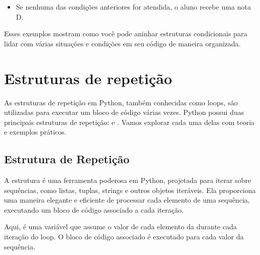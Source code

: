 \documentclass[letterpaper,10pt,english]{jupyterBook}
\begin{document}
\sphinxAtStartPar
{}
\begin{itemize}
\item {} 
\sphinxAtStartPar
Se nenhuma das condições anteriores for atendida, o aluno recebe uma nota D.

\end{itemize}

\sphinxAtStartPar
Esses exemplos mostram como você pode aninhar estruturas condicionais para lidar com várias situações e condições em seu código de maneira organizada.


\section{Estruturas de repetição}
\label{\detokenize{chapters/ch4/ch4:estruturas-de-repeticao}}
\sphinxAtStartPar
As estruturas de repetição em Python, também conhecidas como loops, são utilizadas para executar um bloco de código várias vezes. Python possui duas principais estruturas de repetição:  e . Vamos explorar cada uma delas com teoria e exemplos práticos.


\subsection{Estrutura de Repetição }
\label{\detokenize{chapters/ch4/ch4:estrutura-de-repeticao-for}}
\sphinxAtStartPar
A estrutura  é uma ferramenta poderosa em Python, projetada para iterar sobre sequências, como listas, tuplas, strings e outros objetos iteráveis. Ela proporciona uma maneira elegante e eficiente de processar cada elemento de uma sequência, executando um bloco de código associado a cada iteração.

\sphinxAtStartPar
{}

\begin{sphinxVerbatim}[commandchars=\\\{\}]
   
\end{sphinxVerbatim}

\sphinxAtStartPar
Aqui,  é uma variável que assume o valor de cada elemento da  durante cada iteração do loop. O bloco de código associado é executado para cada valor da sequência.
\end{document}
